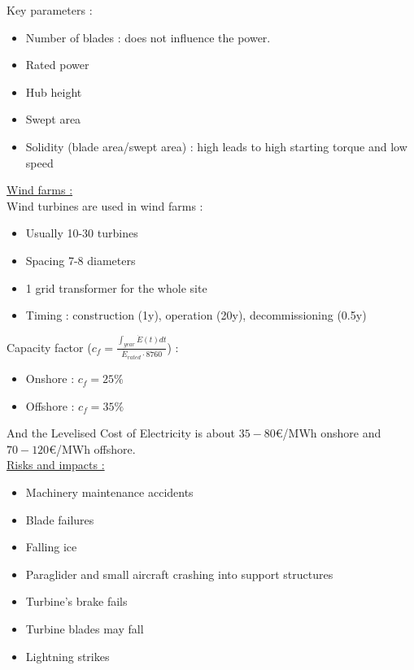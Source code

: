 \documentclass[../main.tex]{subfiles}
\begin{document}
Key parameters :\begin{itemize}
    \item Number of blades : does not influence the power. 
    \item Rated power
    \item Hub height
    \item Swept area
    \item Solidity (blade area/swept area) : high leads to high starting torque and low speed
\end{itemize}


\quad \underline{Wind farms :}\\

Wind turbines are used in wind farms : \begin{itemize}
    \item Usually 10-30 turbines
    \item Spacing 7-8 diameters
    \item 1 grid transformer for the whole site 
    \item Timing : construction (1y), operation (20y), decommissioning (0.5y)
\end{itemize}

Capacity factor ($c_f = \frac{\int_{year} \dot{E}(t) dt}{\dot{E}_{rated} \cdot 8760}$) : \begin{itemize}
    \item Onshore : $c_f = 25\%$
    \item Offshore : $c_f = 35\%$
\end{itemize}

And the Levelised Cost of Electricity is about $35-80 $€/MWh onshore and $70-120$€/MWh offshore.\\

\quad \underline{Risks and impacts :}\\

\begin{itemize}
    \item Machinery maintenance accidents
    \item Blade failures
    \item Falling ice
    \item Paraglider and small aircraft crashing into support structures
    \item Turbine's brake fails 
    \item Turbine blades may fall
    \item Lightning strikes
\end{itemize}
\end{document}
